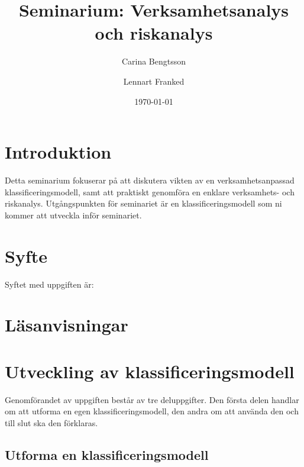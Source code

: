 \documentclass[a4paper]{llncs}
\begin{document}
\title{Seminarium: Verksamhetsanalys och riskanalys}
\author{%
  Carina Bengtsson
  \and
  Lennart Franked
}
\date{\today}

\maketitle

\section{Introduktion}
\label{sec:introduction}

Detta seminarium fokuserar på att diskutera vikten av en verksamhetsanpassad 
klassificeringsmodell, samt att praktiskt genomföra en enklare verksamhets- och 
riskanalys.
Utgångspunkten för seminariet är en klassificeringsmodell som ni kommer att 
utveckla inför seminariet.


\section{Syfte}
\label{sec:aim}

Syftet med uppgiften är:
\begin{itemize}
  
\end{itemize}


\section{Läsanvisningar}




\section{Utveckling av klassificeringsmodell}
\label{sec:work}

Genomförandet av uppgiften består av tre deluppgifter.
Den första delen handlar om att utforma en egen klassificeringsmodell, den 
andra om att använda den och till slut ska den förklaras.

\subsection{Utforma en klassificeringsmodell}
\label{sec:develop}
\end{document}
